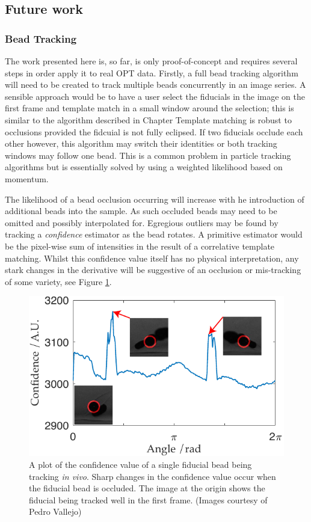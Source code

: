 \subsection{Future work}

\subsubsection{Bead Tracking}
The work presented here is, so far, is only proof-of-concept and requires several steps in order apply it to real OPT data.
Firstly, a full bead tracking algorithm will need to be created to track multiple beads concurrently in an image series.
A sensible approach would be to have a user select the fiducials in the image on the first frame and template match in a small window around the selection; this is similar to the algorithm described in Chapter %
Template matching is robust to occlusions provided the fidcuial is not fully eclipsed.
If two fiducials occlude each other however, this algorithm may switch their identities or both tracking windows may follow one bead.
This is a common problem in particle tracking algorithms but is essentially solved by using a weighted likelihood based on momentum.

The likelihood of a bead occlusion occurring will increase with he introduction of additional beads into the sample.
As such occluded beads may need to be omitted and possibly interpolated for.
Egregious outliers may be found by tracking a \emph{confidence} estimator as the bead rotates.
A primitive estimator would be the pixel-wise sum of intensities in the result of a correlative template matching.
Whilst this confidence value itself has no physical interpretation, any stark changes in the derivative will be suggestive of an occlusion or mis-tracking of some variety, see Figure \ref{fig:confidence_bead_tracking}.

\begin{figure}
  \centering
  \includegraphics{Chapters/flopt/Figs/PDF/results/confidence_bead_tracking}
  \caption{A plot of the confidence value of a single fiducial bead being tracking \emph{in vivo}.
  Sharp changes in the confidence value occur when the fiducial bead is occluded.
  The image at the origin shows the fiducial being tracked well in the first frame.
  (Images courtesy of Pedro Vallejo)
  }
  \label{fig:confidence_bead_tracking}
\end{figure}

